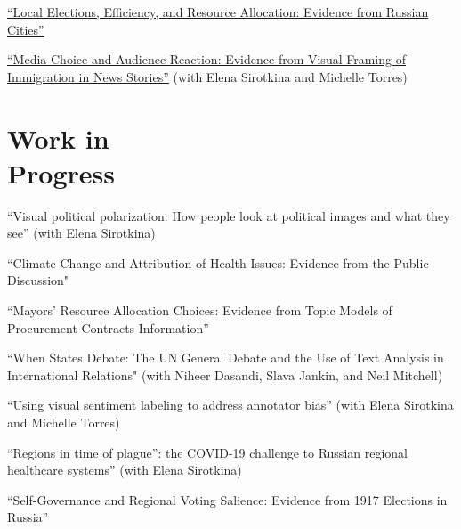 \documentclass[margin,line,10.95pt]{res}
\begin{document}
\begin{resume}
\href{https://olgasparyan.com/documents/jmp_feb.pdf}{``Local Elections, Efficiency, and Resource Allocation: Evidence from Russian Cities''}

\vspace*{-2.5mm}

\href{https://osf.io/4tfjx}{``Media Choice and Audience Reaction: Evidence from Visual Framing of Immigration in News Stories''} (with Elena Sirotkina and Michelle Torres)


\section{\sc Work in \\ Progress}
``Visual political polarization: How people look at political images and what they see'' (with Elena Sirotkina)

\vspace*{-3.5mm}
``Climate Change and Attribution of Health Issues: Evidence from the Public Discussion" 

\vspace*{-2.5mm}

``Mayors’ Resource Allocation Choices: Evidence from Topic Models of Procurement
Contracts Information''

\vspace*{-3.5mm}
``When States Debate: The UN General Debate and the Use of Text Analysis in International Relations" (with Niheer Dasandi, Slava Jankin, and Neil Mitchell)


\vspace*{-3.5mm}
``Using visual sentiment labeling to address annotator bias'' (with Elena Sirotkina and Michelle Torres)


\vspace*{-3.5mm}
``Regions in time of plague”: the COVID-19 challenge to Russian regional healthcare systems'' (with Elena Sirotkina) 

\vspace*{-3.5mm}
``Self-Governance and Regional Voting Salience: Evidence from 1917 Elections in Russia''


\end{resume}
\end{document}
